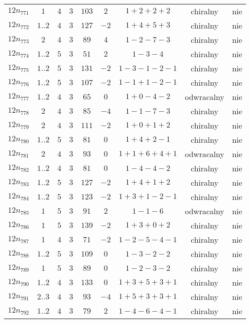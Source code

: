 \begin{longtable}{ccccccccc}
$12n_{771}$ & $1$ & $4$ & $3$ & $103$ & $2$ & $1+2+2+2$ & chiralny & nie \\
$12n_{772}$ & $1..2$ & $4$ & $3$ & $127$ & $-2$ & $1+4+5+3$ & chiralny & nie \\
$12n_{773}$ & $2$ & $4$ & $3$ & $89$ & $4$ & $1-2-7-3$ & chiralny & nie \\
$12n_{774}$ & $1..2$ & $5$ & $3$ & $51$ & $2$ & $1-3-4$ & chiralny & nie \\
$12n_{775}$ & $1..2$ & $5$ & $3$ & $131$ & $-2$ & $1-3-1-2-1$ & chiralny & nie \\
$12n_{776}$ & $1..2$ & $5$ & $3$ & $107$ & $-2$ & $1-1+1-2-1$ & chiralny & nie \\
$12n_{777}$ & $1..2$ & $4$ & $3$ & $65$ & $0$ & $1+0-4-2$ & odwracalny & nie \\
$12n_{778}$ & $2$ & $4$ & $3$ & $85$ & $-4$ & $1-1-7-3$ & chiralny & nie \\
$12n_{779}$ & $2$ & $4$ & $3$ & $111$ & $-2$ & $1+0+1+2$ & chiralny & nie \\
$12n_{780}$ & $1..2$ & $5$ & $3$ & $81$ & $0$ & $1+4+2-1$ & chiralny & nie \\
$12n_{781}$ & $2$ & $4$ & $3$ & $93$ & $0$ & $1+1+6+4+1$ & odwracalny & nie \\
$12n_{782}$ & $1..2$ & $4$ & $3$ & $81$ & $0$ & $1-4-4-2$ & chiralny & nie \\
$12n_{783}$ & $1..2$ & $5$ & $3$ & $127$ & $-2$ & $1+4+1+2$ & chiralny & nie \\
$12n_{784}$ & $1..2$ & $5$ & $3$ & $123$ & $-2$ & $1+3+1-2-1$ & chiralny & nie \\
$12n_{785}$ & $1$ & $5$ & $3$ & $91$ & $2$ & $1-1-6$ & odwracalny & nie \\
$12n_{786}$ & $1$ & $5$ & $3$ & $139$ & $-2$ & $1+3+0+2$ & chiralny & nie \\
$12n_{787}$ & $1$ & $4$ & $3$ & $71$ & $-2$ & $1-2-5-4-1$ & chiralny & nie \\
$12n_{788}$ & $1..2$ & $5$ & $3$ & $109$ & $0$ & $1-3-2-2$ & chiralny & nie \\
$12n_{789}$ & $1$ & $5$ & $3$ & $89$ & $0$ & $1-2-3-2$ & chiralny & nie \\
$12n_{790}$ & $1..2$ & $4$ & $3$ & $133$ & $0$ & $1+3+5+3+1$ & chiralny & nie \\
$12n_{791}$ & $2..3$ & $4$ & $3$ & $93$ & $-4$ & $1+5+3+3+1$ & chiralny & nie \\
$12n_{792}$ & $1..2$ & $4$ & $3$ & $79$ & $2$ & $1-4-6-4-1$ & chiralny & nie \\

\end{longtable}
